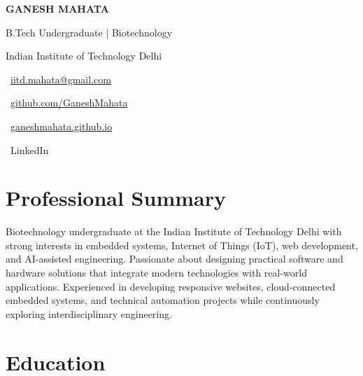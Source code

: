 \documentclass[10pt,a4paper]{article}
\begin{document}

\begin{center}

{\Huge \textbf{GANESH MAHATA}}

\vspace{4pt}

B.Tech Undergraduate | Biotechnology

Indian Institute of Technology Delhi

\vspace{4pt}

\faEnvelope\
\href{mailto:iitd.mahata@gmail.com}{iitd.mahata@gmail.com}
\hspace{10pt}

\faGithub\
\href{https://github.com/GaneshMahata}{github.com/GaneshMahata}

\hspace{10pt}

\faGlobe\
\href{https://ganeshmahata.github.io}
{ganeshmahata.github.io}

\hspace{10pt}

\faLinkedin\
LinkedIn

\end{center}


\section*{Professional Summary}

Biotechnology undergraduate at the Indian Institute of Technology Delhi with strong interests in embedded systems, Internet of Things (IoT), web development, and AI-assisted engineering. Passionate about designing practical software and hardware solutions that integrate modern technologies with real-world applications. Experienced in developing responsive websites, cloud-connected embedded systems, and technical automation projects while continuously exploring interdisciplinary engineering.


\section*{Education}
\end{document}
